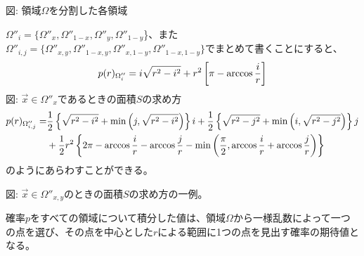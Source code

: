 \documentclass[letterpaper,10pt,english]{sphinxmanual}
\begin{document}
図: 領域\(\Omega\)を分割した各領域

\(\Omega''_{i} = \{\Omega''_{x}, \Omega''_{1-x}, \Omega''_{y}, \Omega''_{1-y}\)\}、また\(\Omega''_{i,j} = \{\Omega''_{x,y}, \Omega''_{1-x,y}, \Omega''_{x,1-y}, \Omega''_{1-x,1-y}\}\)でまとめて書くことにすると、
\begin{gather}
\begin{split}p(r)_{\Omega''_{i}} = i \sqrt{r^{2}-i^{2}} + r^{2} \left[ \pi -\arccos \frac{i}{r} \right]\end{split}\notag
\end{gather}
図:
\(\vec{x} \in \Omega''_{x}\)であるときの面積\(S\)の求め方
\begin{gather}
\begin{split}\begin{align}p(r)_{\Omega''_{i,j}} = &\frac{1}{2}\left\{ \sqrt{r^{2}-i^{2}} + \min \left(j, \sqrt{r^{2}-i^{2}}\right) \right\}i + \frac{1}{2}\left\{ \sqrt{r^{2}-j^{2}} + \min \left( i, \sqrt{r^{2}-j^{2}}\right) \right\}j \\
&+ \frac{1}{2}r^{2} \left\{ 2\pi -\arccos \frac{i}{r}-\arccos \frac{j}{r}-\min \left( \frac{\pi}{2}, \arccos \frac{i}{r} +\arccos \frac{j}{r} \right) \right\}
\end{align}\end{split}\notag
\end{gather}
のようにあらわすことができる。

図:
\(\vec{x} \in \Omega''_{x,y}\)のときの面積\(S\)の求め方の一例。

確率\(p\)をすべての領域について積分した値は、領域\(\Omega\)から一様乱数によって一つの点を選び、その点を中心とした\(r\)による範囲に1つの点を見出す確率の期待値となる。
\end{document}
